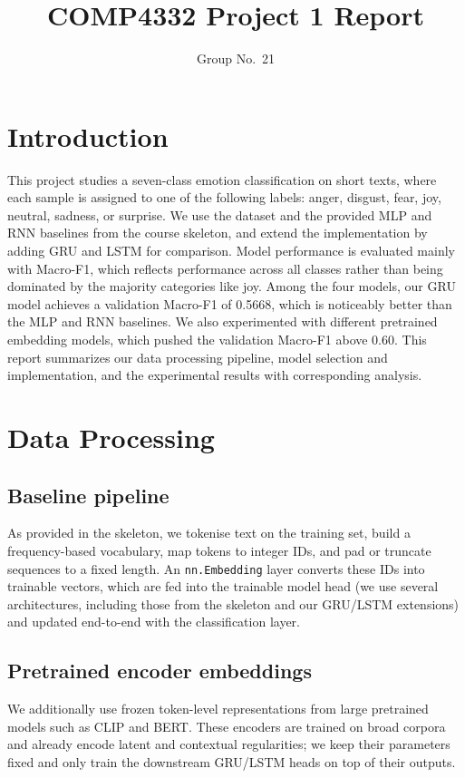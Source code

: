 \documentclass[10pt,twocolumn,letterpaper]{article}
\title{COMP4332 Project 1 Report}
\author{Group No.\ 21}
\begin{document}
\maketitle

\section{Introduction}
\noindent This project studies a seven-class emotion classification on short texts, where each sample is assigned to one of the following labels: anger, disgust, fear, joy, neutral, sadness, or surprise. 
We use the dataset and the provided MLP and RNN baselines from the course skeleton, and extend the implementation by adding GRU and LSTM for comparison. 
Model performance is evaluated mainly with Macro-F1, which reflects performance across all classes rather than being dominated by the majority categories like joy. 
Among the four models, our GRU model achieves a validation Macro-F1 of 0.5668, which is noticeably better than the MLP and RNN baselines. 
We also experimented with different pretrained embedding models, which pushed the validation Macro-F1 above 0.60. 
This report summarizes our data processing pipeline, model selection and implementation, and the experimental results with corresponding analysis.

\section{Data Processing}

\subsection{Baseline pipeline}
\noindent As provided in the skeleton, we tokenise text on the training set, build a frequency-based vocabulary, map tokens to integer IDs, and pad or truncate sequences to a fixed length. An \texttt{nn.Embedding} layer converts these IDs into trainable vectors, which are fed into the trainable model head (we use several architectures, including those from the skeleton and our GRU/LSTM extensions) and updated end-to-end with the classification layer.

\subsection{Pretrained encoder embeddings}
\noindent We additionally use frozen token-level representations from large pretrained models such as CLIP and BERT. These encoders are trained on broad corpora and already encode latent and contextual regularities; we keep their parameters fixed and only train the downstream GRU/LSTM heads on top of their outputs.
\end{document}
